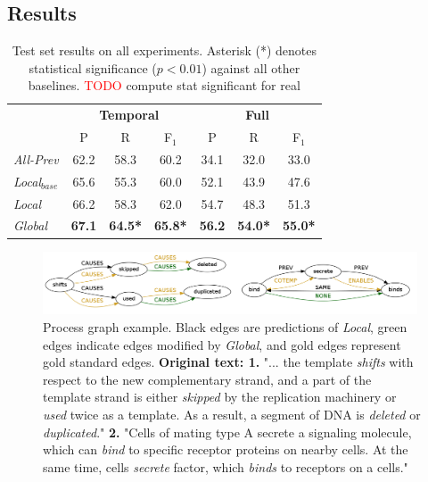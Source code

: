 \subsection{Results} \label{subsec:results}

\begin{table}[t]
{\footnotesize
\begin{tabular}{| l | c | c | c | c | c | c |}
\hline
    & \multicolumn{3}{c|}{\textbf{Temporal}} & \multicolumn{3}{c|}{\textbf{Full}} \\
    & P & R & F$_1$ & P & R & F$_1$ \\
\hline
\hline
\emph{All-Prev} & 62.2 & 58.3 & 60.2 & 34.1 & 32.0 & 33.0 \\
\emph{Local$_{base}$} & 65.6 & 55.3 & 60.0 &  52.1 & 43.9 & 47.6\\
\emph{Local} & 66.2 & 58.3 & 62.0 & 54.7 & 48.3 & 51.3 \\
\emph{Global} & \textbf{67.1} & \textbf{64.5*} & \textbf{65.8*} & \textbf{56.2} & \textbf{54.0*} & \textbf{55.0*} \\
\hline
\end{tabular}}
\caption{Test set results on all experiments. Asterisk (*) denotes statistical significance ($p<0.01$) against all other baselines. \textcolor{red}{TODO} compute stat significant for real}
\label{tab:results}
\end{table}


\begin{figure}[t]
\centering
\includegraphics[width=0.99\textwidth]{figures/example.png} 
\caption{Process graph example. Black edges are predictions of \emph{Local}, green edges indicate edges modified by \emph{Global}, and gold edges represent gold standard edges. \textbf{Original text: 1.} "... the template \emph{shifts} with respect to the new complementary strand, and a part of the template strand is either \emph{skipped} by the replication machinery or \emph{used} twice as a template.
As a result, a segment of DNA is \emph{deleted} or \emph{duplicated}." \textbf{2.} "Cells of mating type A secrete a signaling molecule, which can \emph{bind} to specific receptor proteins on nearby cells. At the same time, cells \emph{secrete} factor, which \emph{binds} to receptors on a cells."}
\label{fig:graph}
\end{figure}

